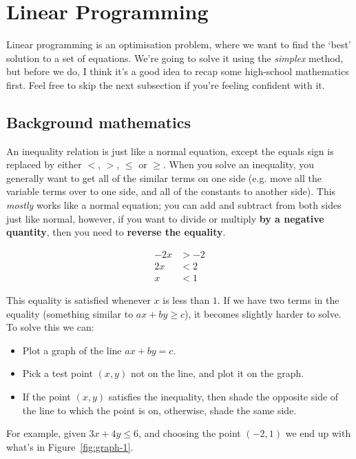\section{Linear Programming}

Linear programming is an optimisation problem, where we want to find the `best'
solution to a set of equations. We're going to solve it using the
\textit{simplex} method, but before we do, I think it's a good idea to recap
some high-school mathematics first. Feel free to skip the next subsection if
you're feeling confident with it.

\subsection{Background mathematics}

An inequality relation is just like a normal equation, except the equals sign is
replaced by either $<$, $>$, $\leq$ or $\geq$. When you solve an inequality, you
generally want to get all of the similar terms on one side (e.g. move all the
variable terms over to one side, and all of the constants to another side). This
\textit{mostly} works like a normal equation; you can add and subtract from both
sides just like normal, however, if you want to divide or multiply \textbf{by a
negative quantity}, then you need to \textbf{reverse the equality}.

\[
  \begin{split}
    -2x &> -2\\
    2x &< 2\\
    x &< 1
  \end{split}
\]

This equality is satisfied whenever $x$ is less than $1$. If we have two terms
in the equality (something similar to $ax + by \geq c$), it becomes slightly
harder to solve. To solve this we can:

\begin{itemize}
  \item Plot a graph of the line $ax + by = c$.
  \item Pick a test point $(x, y)$ not on the line, and plot it on the graph.
  \item If the point $(x, y)$ satisfies the inequality, then shade the opposite 
    side of the line to which the point is on, otherwise, shade the same side.
\end{itemize}

For example, given $3x + 4y \leq 6$, and choosing the point $(-2,1)$ we end up
with what's in Figure~\ref{fig:graph-1}.

